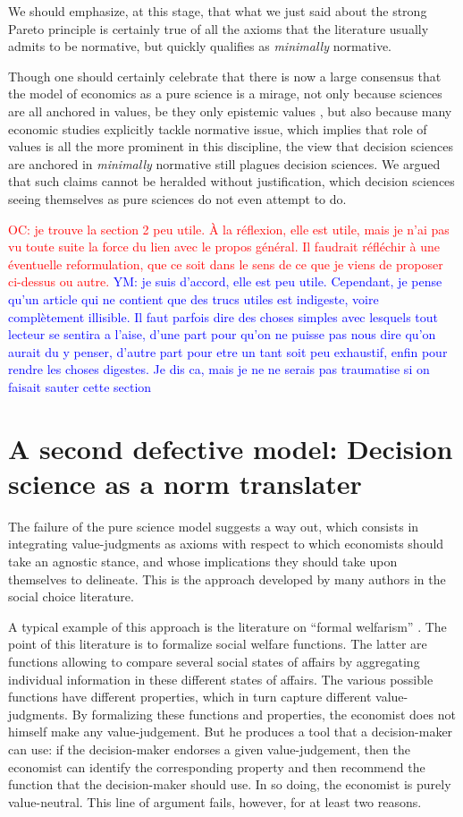 \documentclass[preprint, french, english, 11pt]{elsarticle}%
\newcommand{\commentYM}[1]{\textcolor{blue}{YM: #1}}
\newcommand{\commentOC}[1]{\textcolor{red}{OC: #1}}
\begin{document}
We should emphasize, at this stage, that what we just said about the strong Pareto principle is certainly true of all the axioms that the literature usually admits to be normative, but quickly qualifies as \emph{minimally} normative.

Though one should certainly celebrate that there is now a large consensus that the model of economics as a pure science is a mirage, not only because sciences are all anchored in values, be they only epistemic values \cite{longino_science_1990}, but also because many economic studies explicitly tackle normative issue, which implies that role of values is all the more prominent in this discipline, the view that decision sciences are anchored in \emph{minimally} normative still plagues decision sciences. We argued that such claims cannot be heralded without justification, which decision sciences seeing themselves as pure sciences do not even attempt to do. 

\commentOC{je trouve la section 2 peu utile. À la réflexion, elle est utile, mais je n’ai pas vu toute suite la force du lien avec le propos général. Il faudrait réfléchir à une éventuelle reformulation, que ce soit dans le sens de ce que je viens de proposer ci-dessus ou autre.}
\commentYM{je suis d'accord, elle est peu utile. Cependant, je pense qu'un article qui ne contient que des trucs utiles est indigeste, voire complètement illisible. Il faut parfois dire des choses simples avec lesquels tout lecteur se sentira a l'aise, d'une part pour qu'on ne puisse pas nous dire qu'on aurait du y penser, d'autre part pour etre un tant soit peu exhaustif, enfin pour rendre les choses digestes. Je dis ca, mais je ne ne serais pas traumatise si on faisait sauter cette section}

\section{A second defective model: Decision science as a norm translater}
The failure of the pure science model suggests a way out, which consists in integrating value-judgments as axioms with respect to which economists should take an agnostic stance, and whose implications they should take upon themselves to delineate. This is the approach developed by many authors in the social choice literature.

A typical example of this approach is the literature on ``formal welfarism'' \cite{fleurbaey_informational_2003}. The point of this literature is to formalize social welfare functions. The latter are functions allowing to compare several social states of affairs by aggregating individual information in these different states of affairs. The various possible functions have different properties, which in turn capture different value-judgments. By formalizing these functions and properties, the economist does not himself make any value-judgement. But he produces a tool that a decision-maker can use: if the decision-maker endorses a given value-judgement, then the economist can identify the corresponding property and then recommend the function that the decision-maker should use. In so doing, the economist is purely value-neutral. This line of argument fails, however, for at least two reasons.
\end{document}
